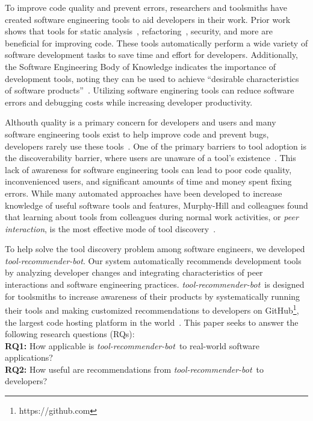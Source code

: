 \documentclass[sigconf,review,anonymous]{acmart}
\newcommand{\tool}{\textsl{tool-recommender-bot}}
\begin{document}
To improve code quality and prevent errors, researchers and toolsmiths have created software engineering tools to aid developers in their work. Prior work shows that tools for static analysis~\cite{UsingStaticAnalysis}, refactoring~\cite{Murphy-HillFitness}, security, and more are beneficial for improving code. These tools automatically perform a wide variety of software development tasks to save time and effort for developers. Additionally, the Software Engineering Body of Knowledge indicates the importance of development tools, noting they can be used to achieve ``desirable characteristics of software products''~\cite{SWEBOK}. Utilizing software enginering tools can reduce software errors and debugging costs while increasing developer productivity.

Althouth quality is a primary concern for developers and users and many software engineering tools exist to help improve code and prevent bugs, developers rarely use these tools~\cite{Johnson2013Why}. One of the primary barriers to tool adoption is the discoverability barrier, where users are unaware of a tool's existence~\cite{Murphy-HillScreencastingDiscovery}. This lack of awareness for software engineering tools can lead to poor code quality, inconvenienced users, and significant amounts of time and money spent fixing errors. While many automated approaches have been developed to increase knowledge of useful software tools and features, Murphy-Hill and colleagues found that learning about tools from colleagues during normal work activities, or \textit{peer interaction}, is the most effective mode of tool discovery~\cite{MurphyHill2011PeerInteraction}.

To help solve the tool discovery problem among software engineers, we developed \tool. Our system automatically recommends development tools by analyzing developer changes and integrating characteristics of peer interactions and software engineering practices. \tool~is designed for toolsmiths to increase awareness of their products by systematically running their tools and making customized recommendations to developers on GitHub\footnote{https://github.com}, the largest code hosting platform in the world~\cite{GousiosGitHub}. This paper seeks to answer the following research questions (RQs): \\

\noindent
\textbf{RQ1:} How applicable is \tool~to real-world software applications?  \\ 
\textbf{RQ2:} How useful are recommendations from \tool~to developers?  \\
\end{document}

